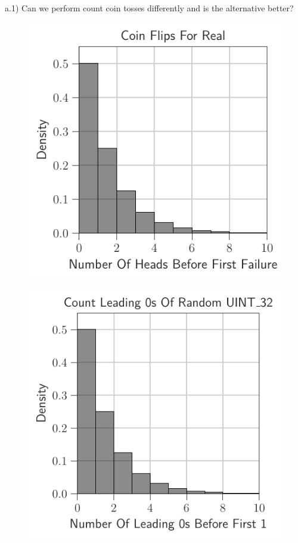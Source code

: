 \documentclass[12pt]{article}
\begin{document}
a.1) Can we perform count coin tosses differently and is the alternative better?

\begin{figure}[H]
	\centering
	\begin{minipage}{0.32\textwidth}
		\centering
		\includegraphics[width=\linewidth]{../notebook/plot/coin_flips_for_real.pdf}
		\label{fig:coin_flips_for_real}
	\end{minipage}\hfill
	\begin{minipage}{0.32\textwidth}
		\centering
		\includegraphics[width=\linewidth]{../notebook/plot/count_leading_0s_of_random_uint_32.pdf}

\end{minipage}
\end{figure}
\end{document}

